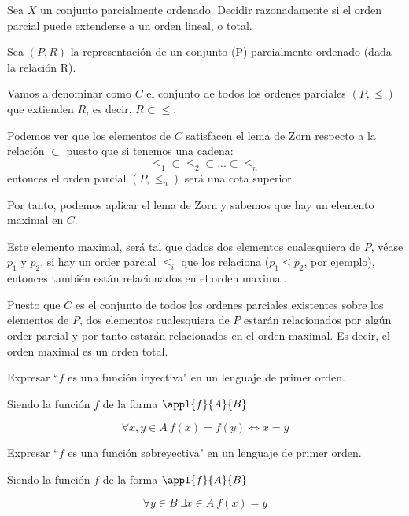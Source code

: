 \begin{problem}[5]
Sea $X$ un conjunto parcialmente ordenado. Decidir razonadamente si el orden parcial puede
extenderse a un orden lineal, o total.
\solution


Sea $(P,R)$ la representación de un conjunto (P) parcialmente ordenado (dada la relación R).

Vamos a denominar como $C$ el conjunto de todos los ordenes parciales $(P,\leq)$ que extienden $R$, es decir, $R \subset \leq$.

Podemos ver que los elementos de $C$ satisfacen el lema de Zorn respecto a la relación $\subset$ puesto que si tenemos una cadena:
\[\leq_1 \subset \leq_2 \subset ... \subset \leq_n\]
entonces el orden parcial $(P,\leq_n)$ será una cota superior.

Por tanto, podemos aplicar el lema de Zorn y sabemos que hay un elemento maximal en $C$.

Este elemento maximal, será tal que dados dos elementos cualesquiera de $P$, véase $p_1$ y $p_2$, si hay un order parcial $\leq_i$ que los relaciona ($p_1 \leq p_2$, por ejemplo), entonces también están relacionados en el orden maximal.

Puesto que $C$ es el conjunto de todos los ordenes parciales existentes sobre los elementos de $P$, dos elementos cualesquiera de $P$ estarán relacionados por algún order parcial y por tanto estarán relacionados en el orden maximal. Es decir, el orden maximal es un orden total.
\end{problem}

\begin{problem}[6]
Expresar ``$f$ es una funci\'on inyectiva"  en un lenguaje de primer orden.
\solution

Siendo la función $f$ de la forma $\appl{f}{A}{B}$

\[\forall x,y \in A \ f(x)=f(y) \iff x=y \]

\end{problem}

\begin{problem}[7]
Expresar ``$f$ es una funci\'on sobreyectiva"  en un lenguaje de primer orden.
\solution


Siendo la función $f$ de la forma $\appl{f}{A}{B}$

\[\forall y \in B \ \exists x \in A \ f(x)=y\]

\end{problem}

